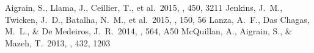 \documentclass[useAMS, usenatbib, preprint, 12pt]{mitthesis}
\begin{document}
% 
% 

\begin{thebibliography}{99}
Aigrain, S., Llama, J., Ceillier, T., et al.\ 2015, \mnras, 450, 3211
Jenkins, J.~M., Twicken, J.~D., Batalha, N.~M., et al.\ 2015, \aj, 150, 56
Lanza, A.~F., Das Chagas, M.~L., \& De Medeiros, J.~R.\ 2014, \aap, 564, A50
McQuillan, A., Aigrain, S., \& Mazeh, T.\ 2013, \mnras, 432, 1203
\end{thebibliography}
\end{document}
